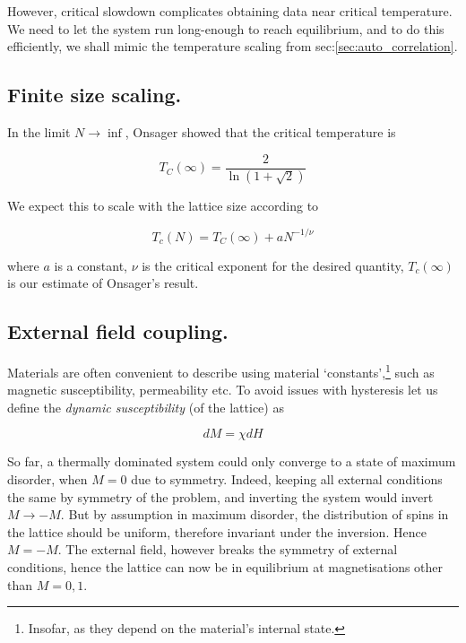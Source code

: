 \documentclass[12pt]{article}
\begin{document}
However, critical slowdown complicates obtaining data near critical temperature. We need to let the system run long-enough to reach equilibrium, and to do this efficiently, we shall mimic the temperature scaling from sec:\ref{sec:auto_correlation}. 

\subsection{Finite size scaling.}\label{sec:scaling}

In the limit \(N \rightarrow \inf \), Onsager showed\cite{Onsager} that the critical temperature is

\begin{equation}\label{eq:onsager}
  T_C (\infty)= \frac{2}{\ln(1 + \sqrt{2})}
\end{equation}

We expect this to scale with the lattice size\cite{fss} according to

\begin{equation}\label{eq:scaling}
  T_c(N) = T_C(\infty) + a N ^{-1/\nu}
\end{equation}

where \(a\) is a constant, \(\nu\) is the critical exponent for the desired quantity\cite{fssCardy}, \(T_c(\infty)\) is our estimate of Onsager's result. 

\subsection{External field coupling.}\label{sec:chi}

Materials are often convenient to describe using material `constants',\footnote{Insofar, as they depend on the material's internal state. } such as magnetic susceptibility, permeability etc. To avoid issues with hysteresis let us define the \emph{dynamic susceptibility} (of the lattice) as

\begin{equation}\label{eq:susceptibility}
  d M = \chi dH
\end{equation}

So far, a thermally dominated system could only converge to a state of maximum disorder, when \(M = 0\) due to symmetry. Indeed, keeping all external conditions the same by symmetry of the problem, and inverting the system would invert \(M \rightarrow -M\). But by assumption in maximum disorder, the distribution of spins in the lattice should be uniform, therefore invariant under the inversion. Hence \(M = -M\). The external field, however breaks the symmetry of external conditions, hence the lattice can now be in equilibrium at magnetisations other than \(M = 0, 1\).
\end{document}
